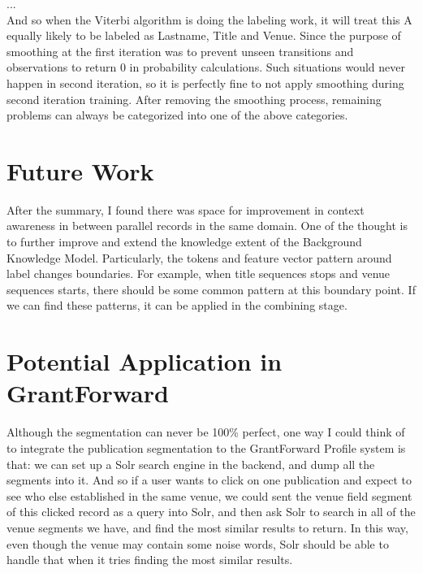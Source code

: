 \documentclass[11pt]{article}
\begin{document}
...\\

And so when the Viterbi algorithm is doing the labeling work, it will treat this A equally likely to be labeled as Lastname, Title and Venue. Since the purpose of smoothing at the first iteration was to prevent unseen transitions and observations to return 0 in probability calculations. Such situations would never happen in second iteration, so it is perfectly fine to not apply smoothing during second iteration training. After removing the smoothing process, remaining problems can always be categorized into one of the above categories.


\section{Future Work}
After the summary, I found there was space for improvement in context awareness in between parallel records in the same domain. One of the thought is to further improve and extend the knowledge extent of the Background Knowledge Model. Particularly, the tokens and feature vector pattern around label changes boundaries. For example, when title sequences stops and venue sequences starts, there should be some common pattern at this boundary point. If we can find these patterns, it can be applied in the combining stage.

\section{Potential Application in GrantForward}
Although the segmentation can never be 100\% perfect, one way I could think of to integrate the publication segmentation to the GrantForward Profile system is that: we can set up a Solr search engine in the backend, and dump all the segments into it. And so if a user wants to click on one publication and expect to see who else established in the same venue, we could sent the venue field segment of this clicked record as a query into Solr, and then ask Solr to search in all of the venue segments we have, and find the most similar results to return. In this way, even though the venue may contain some noise words, Solr should be able to handle that when it tries finding the most similar results. 
\end{document}
